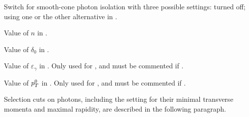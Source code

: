 \documentclass[english,11pt]{article}
\begin{document}
\quad  Switch for smooth-cone photon isolation with three possible settings: turned off; using one or the other alternative in .

\quad Value of $n$ in .

\quad Value of $\delta_0$ in .

\quad Value of $\varepsilon_\gamma$ in . Only used for , 
and must be commented if .

\quad Value of $p_T^0$ in . Only used for , 
and must be commented if .


Selection cuts on photons, including the setting for their minimal transverse momenta and maximal rapidity, are described in the following paragraph.
\end{document}
